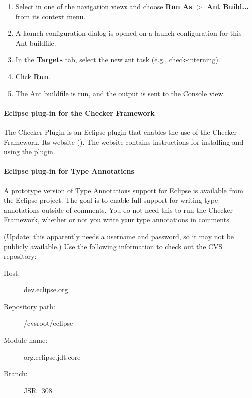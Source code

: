 \begin{enumerate}

\item
  Select  in one of the navigation views and choose
  {\bf Run As $>$ Ant Build...} from its context menu.

\item
  A launch configuration dialog is opened on a launch configuration
  for this Ant buildfile.

\item
  In the {\bf Targets} tab, select the new ant task (e.g., check-interning).

\item
  Click {\bf Run}.

\item
  The Ant buildfile is run, and the output is sent to the Console view.

\end{enumerate}

\paragraph{Eclipse plug-in for the Checker Framework}

The Checker Plugin is an Eclipse plugin that enables the use of the Checker
Framework.
Its website ().
The website contains instructions for installing and using the plugin.

\paragraph{Eclipse plug-in for Type Annotations}

A prototype version of Type Annotations support for Eclipse is
available from the Eclipse project.  The goal is to enable full support for
writing
type annotations outside of comments.  You do not need this to run the
Checker Framework, whether or not you write your type annotations in comments.

(Update:  this apparently needs a username and password, so it may not be
publicly available.)
Use the following information to check
out the CVS repository:
\begin{description}
\item[Host:]                 dev.eclipse.org
\item[Repository path:] /cvsroot/eclipse
\item[Module name:]    org.eclipse.jdt.core
\item[Branch:]             JSR\_308
\end{description}


